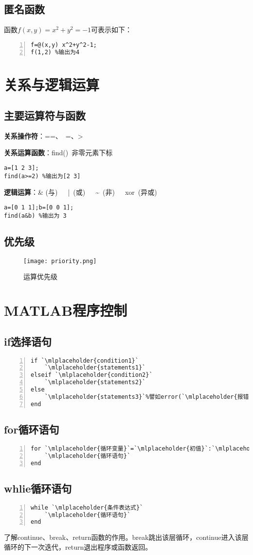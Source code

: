 \subsection{匿名函数}
函数$f(x,y)=x^2+y^2=-1$可表示如下：
\begin{lstlisting}[frame=single,numbers=left]
f=@(x,y) x^2+y^2-1;
f(1,2) %输出为4
\end{lstlisting}
\section{关系与逻辑运算}
\subsection{主要运算符与函数}
\textbf{关系操作符}：==、~=、>

\textbf{关系运算函数}：find()~非零元素下标
\begin{lstlisting}
a=[1 2 3];
find(a>=2) %输出为[2 3]
\end{lstlisting}

\textbf{逻辑运算}：\& (与)~~~|~(或)~~~\~{}~(非)~~~xor~(异或)
\begin{lstlisting}
a=[0 1 1];b=[0 0 1];
find(a&b) %输出为 3
\end{lstlisting}
\subsection{优先级}
\begin{figure}[htbp]
	\centering
	\texttt{[image: priority.png]}
	\caption{运算优先级}
\end{figure}
\newpage
\section{MATLAB程序控制}
\subsection{if选择语句}
\begin{lstlisting}[frame=single,numbers=left]
if `\mlplaceholder{condition1}`
    `\mlplaceholder{statements1}`
elseif `\mlplaceholder{condition2}`
    `\mlplaceholder{statements2}`
else
    `\mlplaceholder{statements3}`%譬如error(`\mlplaceholder{报错内容}`)
end
\end{lstlisting}
\subsection{for循环语句}
\begin{lstlisting}[frame=single,numbers=left]
for `\mlplaceholder{循环变量}`=`\mlplaceholder{初值}`:`\mlplaceholder{步长}`:`\mlplaceholder{终值}`
    `\mlplaceholder{循环语句}`
end
\end{lstlisting}
\subsection{whlie循环语句}
\begin{lstlisting}[frame=single,numbers=left]
while `\mlplaceholder{条件表达式}`
    `\mlplaceholder{循环语句}`
end
\end{lstlisting}
\begin{note}
了解continue、break、return函数的作用。break跳出该层循环，continue进入该层循环的下一次迭代，return退出程序或函数返回。
\end{note}